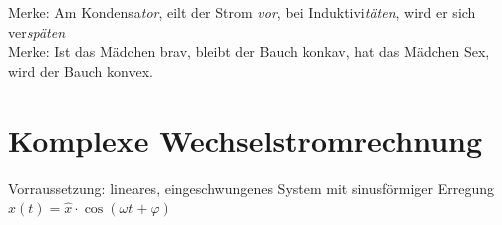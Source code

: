\documentclass[fs, footer]{latex4ei}
\begin{document}
\begin{multicols*}{4}
    Merke: Am Kondensa\textsl{tor}, eilt der Strom \textsl{vor}, bei Induktivi\textsl{täten}, wird er sich ver\textsl{späten}\\
    Merke: Ist das Mädchen brav, bleibt der Bauch konkav, hat das Mädchen Sex, wird der Bauch konvex.\\
    \columnbreak
    \section{Komplexe Wechselstromrechnung}
    Vorraussetzung: lineares, eingeschwungenes System mit sinusförmiger Erregung $x(t) = \hat x \cdot \cos(\omega t + \varphi)$\\
\end{multicols*}
\end{document}
